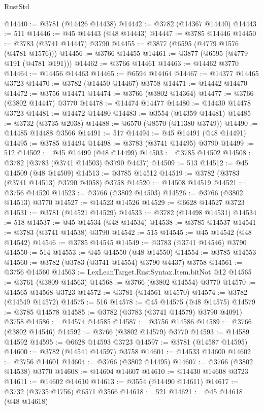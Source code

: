 \begin{lexlean}{RustStd}
\begin{coremodule}
@14440 := @3781 (@14426 @14438)
@14442 := @3782 (@14367 @14440)
@14443 := 511
@14446 := @45 @14443 (@48 @14443)
@14447 := @3785 @14446
@14450 := @3783 (@3741 @14447) @3790
@14455 := @3877 (@6595 (@4779 @1576 (@4781 @1576)))
@14456 := @3766 @14455
@14461 := @3877 (@6595 (@4779 @191 (@4781 @191)))
@14462 := @3766 @14461
@14463 := @14462 @3770
@14464 := @14456 @14463
@14465 := @6594 @14464
@14467 := @14377 @14465 @3723
@14470 := @3782 (@14450 @14467) @3758
@14471 := @14442 @14470
@14472 := @3756 @14471
@14474 := @3766 (@3802 @14364)
@14477 := @3766 (@3802 @14447) @3770
@14478 := @14474 @14477
@14480 := @14430 @14478 @3723
@14481 := @14472 @14480
@14483 := @3554 (@14359 @14481)
@14485 := @3732 (@3735 @2038)
@14488 := @6570 (@8570 (@11380 @3749))
@14490 := @14485 @14488 @3566
@14491 := 517
@14494 := @45 @14491 (@48 @14491)
@14495 := @3785 @14494
@14498 := @3783 (@3741 @14495) @3790
@14499 := 512
@14502 := @45 @14499 (@48 @14499)
@14503 := @3785 @14502
@14508 := @3782 (@3783 (@3741 @14503) @3790 @4437)
@14509 := 513
@14512 := @45 @14509 (@48 @14509)
@14513 := @3785 @14512
@14519 := @3782 (@3783 (@3741 @14513) @3790 @4058) @3758
@14520 := @14508 @14519
@14521 := @3756 @14520
@14523 := @3766 (@3802 @14503)
@14526 := @3766 (@3802 @14513) @3770
@14527 := @14523 @14526
@14529 := @6628 @14527 @3723
@14531 := @3781 (@14521 @14529)
@14533 := @3782 (@14498 @14531)
@14534 := 518
@14537 := @45 @14534 (@48 @14534)
@14538 := @3785 @14537
@14541 := @3783 (@3741 @14538) @3790
@14542 := 515
@14545 := @45 @14542 (@48 @14542)
@14546 := @3785 @14545
@14549 := @3783 (@3741 @14546) @3790
@14550 := 514
@14553 := @45 @14550 (@48 @14550)
@14554 := @3785 @14553
@14560 := @3782 (@3783 (@3741 @14554) @3790 @4437) @3758
@14561 := @3756 @14560
@14563 := LexLeanTarget.RustSyntax.Item.bitNot @12
@14565 := @3761 (@3809 @14563)
@14568 := @3766 (@3802 @14554) @3770
@14570 := @14565 @14568 @3723
@14572 := @3781 (@14561 @14570)
@14574 := @3782 (@14549 @14572)
@14575 := 516
@14578 := @45 @14575 (@48 @14575)
@14579 := @3785 @14578
@14585 := @3782 (@3783 (@3741 @14579) @3790 @4091) @3758
@14586 := @14574 @14585
@14587 := @3756 @14586
@14589 := @3766 (@3802 @14546)
@14592 := @3766 (@3802 @14579) @3770
@14593 := @14589 @14592
@14595 := @6628 @14593 @3723
@14597 := @3781 (@14587 @14595)
@14600 := @3782 (@14541 @14597) @3758
@14601 := @14533 @14600
@14602 := @3756 @14601
@14604 := @3766 (@3802 @14495)
@14607 := @3766 (@3802 @14538) @3770
@14608 := @14604 @14607
@14610 := @14430 @14608 @3723
@14611 := @14602 @14610
@14613 := @3554 (@14490 @14611)
@14617 := @3732 (@3735 @1756) @6571 @3566
@14618 := 521
@14621 := @45 @14618 (@48 @14618)

\end{coremodule}
\end{lexlean}
